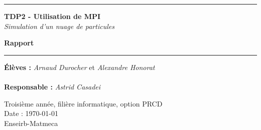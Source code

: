 \thispagestyle{empty}


%
\hrule
\begin{flushleft}
\Huge{\textbf{TDP2 - Utilisation de MPI}}\\
\textit{Simulation d'un nuage de particules}
\end{flushleft}
\begin{flushright}
\huge\textbf{Rapport}\\
\end{flushright}
\hrule

\vspace{80pt}
\noindent\textbf{Élèves :}
\emph{Arnaud Durocher} et \emph{Alexandre Honorat}\\
\\
\noindent\textbf{Responsable :}
\emph{Astrid Casadei}\\


\vspace{60pt}
\normalsize
\begin{center}
  Troisième année, filière informatique, option PRCD\\
  Date : \today\\
  Enseirb-Matmeca
\end{center}
\vspace{50pt}
